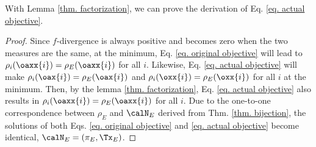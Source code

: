 With Lemma \ref{thm. factorization}, we can prove the derivation of Eq. \ref{eq. actual objective}.
\begin{proof}
Since $f$-divergence is always positive and becomes zero when the two measures are the same, at the minimum, Eq. \ref{eq. original objective} will lead to $\rho_i(\oaxx{i})=\rho_E(\oaxx{i})$ for all $i$. Likewise, Eq. \ref{eq. actual objective} will make $\rho_i(\oax{i})=\rho_E(\oax{i})$ and $\rho_i(\oxx{i})=\rho_E(\oxx{i})$ for all $i$ at the minimum. Then, by the lemma \ref{thm. factorization}, Eq. \ref{eq. actual objective} also results in $\rho_i(\oaxx{i})=\rho_E(\oaxx{i})$ for all $i$. Due to the one-to-one correspondence between $\rho_{E}$ and $\calN_E$ derived from Thm. \ref{thm. bijection}, the solutions of both Eqs. \ref{eq. original objective} and \ref{eq. actual objective} become identical, $\calN_E=(\pi_E, \Tx_E)$.
\end{proof}


